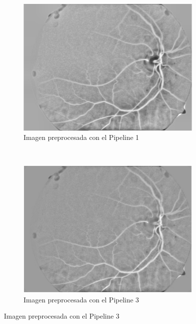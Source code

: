 \begin{figure} [H] 
    \centering
    \begin{subfigure}[b]{0.3\textwidth}
        \includegraphics[width=\textwidth]{Figures/ARIA/pipe1-aria_c_39_a_10_cropped}
        \caption{Imagen preprocesada con el Pipeline 1}
        \label{fig:gull}
    \end{subfigure}
    ~ %
    \begin{subfigure}[b]{0.3\textwidth}
        \includegraphics[width=\textwidth]{Figures/ARIA/pipe3-aria_c_39_a_10_cropped}
        \caption{Imagen preprocesada con el Pipeline 3}

\end{subfigure}
\end{figure}
